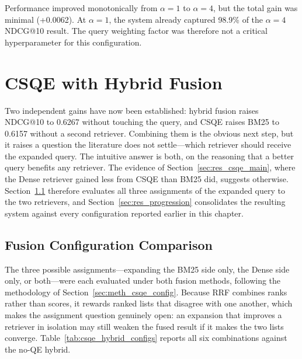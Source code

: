 Performance improved monotonically from $\alpha=1$ to $\alpha=4$, but the total gain was minimal (+0.0062). At $\alpha=1$, the system already captured 98.9\% of the $\alpha=4$ NDCG@10 result. The query weighting factor was therefore not a critical hyperparameter for this configuration.

\section{CSQE with Hybrid Fusion}
\label{sec:res_csqe_hybrid}

Two independent gains have now been established: hybrid fusion raises NDCG@10 to 0.6267 without touching the query, and CSQE raises BM25 to 0.6157 without a second retriever. Combining them is the obvious next step, but it raises a question the literature does not settle---which retriever should receive the expanded query. The intuitive answer is both, on the reasoning that a better query benefits any retriever. The evidence of Section~\ref{sec:res_csqe_main}, where the Dense retriever gained less from CSQE than BM25 did, suggests otherwise. Section~\ref{sec:res_csqe_configs} therefore evaluates all three assignments of the expanded query to the two retrievers, and Section~\ref{sec:res_progression} consolidates the resulting system against every configuration reported earlier in this chapter.

\subsection{Fusion Configuration Comparison}
\label{sec:res_csqe_configs}

The three possible assignments---expanding the BM25 side only, the Dense side only, or both---were each evaluated under both fusion methods, following the methodology of Section~\ref{sec:meth_csqe_config}. Because RRF combines ranks rather than scores, it rewards ranked lists that disagree with one another, which makes the assignment question genuinely open: an expansion that improves a retriever in isolation may still weaken the fused result if it makes the two lists converge. Table~\ref{tab:csqe_hybrid_configs} reports all six combinations against the no-QE hybrid.

